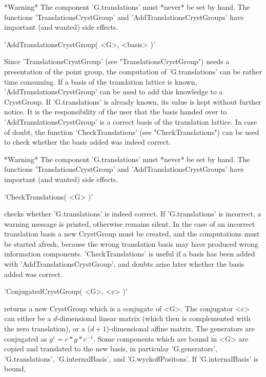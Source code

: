 *Warning\:* The  component 'G.translations' must *never* be  set by hand.
The functions 'TranslationsCrystGroup'  and  'AddTranslationsCrystGroups'
have important (and wanted) side effects.

%

'AddTranslationsCrystGroup( <G>, <basis> )'

Since  'TranslationsCrystGroup' (see   "TranslationsCrystGroup") needs  a
presentation of the point group,  the computation of 'G.translations' can
be rather time consuming. If a basis of the translation lattice is known,
'AddTranslationsCrystGroup'  can  be used   to add  this  knowledge  to a
CrystGroup.   If 'G.translations'  is already  known,  its  value is kept
without further  notice.  It is  the responsibility of  the user that the
basis handed  over to 'AddTranslationsCrystGroup' is  a  correct basis of
the     translation   lattice.    In  case   of    doubt,   the  function
'CheckTranslations'   (see "CheckTranslations")  can  be   used  to check
whether the basis added was indeed correct.

*Warning\:* The  component 'G.translations' must *never* be  set by hand.
The functions 'TranslationsCrystGroup'  and  'AddTranslationsCrystGroups'
have important (and wanted) side effects.

%

'CheckTranslations( <G> )'

checks whether 'G.translations' is indeed correct. If 'G.translations' is
incorrect, a warning message is printed, otherwise {\GAP} remains silent.
In the case  of an incorrect  translation basis a  new CrystGroup must be
created, and the computations  must be started  afresh, because the wrong
translation  basis  may    have produced   wrong  information components.
'CheckTranslations'  is  useful  if  a   basis   has    been  added  with
'AddTranslationsCrystGroup',  and doubts  arise  later whether the  basis
added was correct.

%

'ConjugatedCrystGroup( <G>, <c> )'

returns a new CrystGroup which is a conjugate of <G>.  The conjugator <c>
can either be a $d$-dimensional linear matrix (which then is complemented
with the zero translation), or  a ($d+1$)-dimensional affine matrix.  The
generators are conjugated as $g^c  = c*g*c^{-1}$.  Some components  which
are  bound in  <G> are   copied  and  translated to   the  new basis,  in
particular   'G.generators',   'G.translations',  'G.internalBasis',  and
'G.wyckoffPositons'.  If 'G.internalBasis' is bound,

